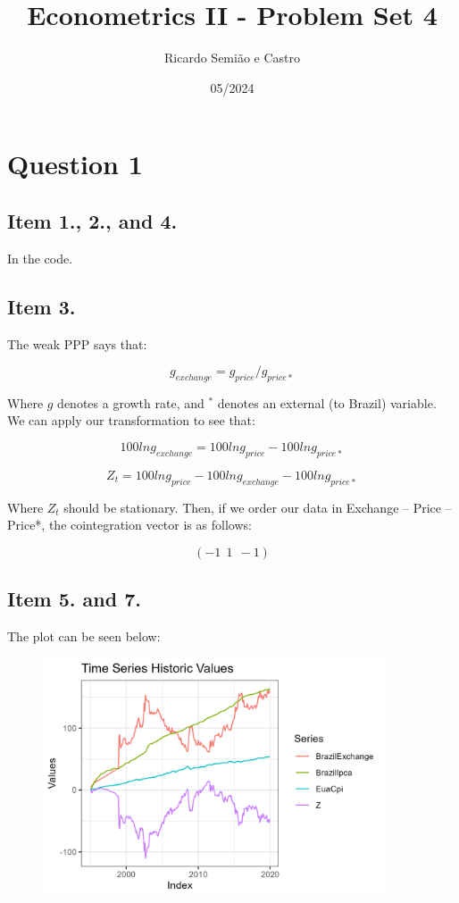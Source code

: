 \documentclass[12pt]{article}
\title{Econometrics II - Problem Set 4}
\author{Ricardo Semião e Castro}
\date{05/2024}
\begin{document}
\maketitle

\section*{Question 1}

\subsection*{Item 1., 2., and 4.}
In the code.


\subsection*{Item 3.}
The weak PPP says that:

$$g_{exchange} = g_{price}/g_{price*}$$

Where $g$ denotes a growth rate, and $^*$ denotes an external (to Brazil) variable. We can apply our transformation to see that:

$$100ln g_{exchange} = 100ln g_{price} - 100ln g_{price*}$$

$$Z_t = 100ln g_{price} - 100ln g_{exchange} - 100ln g_{price*}$$

Where $Z_t$ should be stationary. Then, if we order our data in Exchange -- Price -- Price*, the cointegration vector is as follows:

$$(-1 ~~ 1 ~~ -1)$$


\subsection*{Item 5. and 7.}
The plot can be seen below:

\begin{figure}[H]
    \centering
    \includegraphics[width=0.9\textwidth]{figures/historic.png}
\end{figure}
\end{document}
